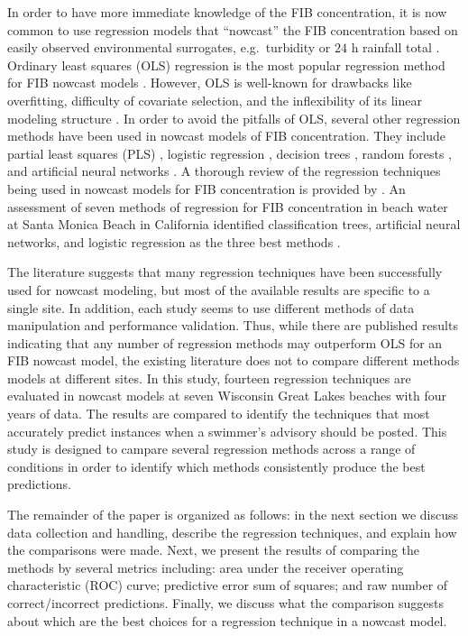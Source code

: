 \documentclass[authoryear,review, 12pt]{elsarticle}
\begin{document}
In order to have more immediate knowledge of the FIB concentration, it
is now common to use regression models that ``nowcast'' the FIB
concentration based on easily observed environmental surrogates,
e.g.~turbidity or $24$ h rainfall total \citep{Brandt:2006gj,Olyphant:2004yq}. Ordinary least squares (OLS) regression is the most popular
regression method for FIB nowcast models
\citep{Nevers:2005ln,Francy:2007yv,deBrauwere-Koffi-Servais-2014}. However, OLS is well-known for
drawbacks like overfitting, difficulty of covariate selection, and the
inflexibility of its linear modeling structure \citep{Ge:2007ou}. 
In order to avoid the pitfalls of OLS, several other regression methods have been used in
 nowcast models of FIB concentration. They include 
partial least squares (PLS) \citep{Hou:2006nf,Brooks-Fienen-Corsi-2013}, logistic regression \citep{Waschbusch:2004bd,Jin:2006tr}, decision trees \citep{Stidson-2012}, random forests
\citep{Parkhurst:2005zf,Jones-Liu-Dorovitch-2012}, and artificial
neural networks \citep{Kashefipour-Lin-Falconer-2005,He:2008jx}. A
thorough review of the regression techniques being used in nowcast
models for FIB concentration is provided by
\cite{deBrauwere-Koffi-Servais-2014}. An assessment of seven methods of
regression for FIB concentration in beach water at Santa Monica Beach in
California identified classification trees, artificial neural networks,
and logistic regression as the three best methods
\citep{Thoe-Gold-Griesbach-Grimmer-Taggart-Boehm-2014}.

The literature suggests that many regression techniques have been
successfully used for nowcast modeling, but most of the available results are 
specific to a single site. In addition, each study seems to use different methods of data manipulation and performance validation. Thus, while there are published results indicating that any number of regression methods may outperform OLS for an FIB nowcast model, the existing literature does not to compare different methods models at different sites. In this
study, fourteen regression techniques are evaluated in nowcast models at
seven Wisconsin Great Lakes beaches with four years of data. The results
are compared to identify the techniques that most accurately predict
instances when a swimmer's advisory should be posted. This study is designed to 
campare several regression methods across a range of conditions in order to identify which 
methods consistently produce the best predictions.

The remainder of the paper is organized as follows: in the next section
we discuss data collection and handling, describe the regression
techniques, and explain how the comparisons were made. Next, we present
the results of comparing the methods by several metrics including: area
under the receiver operating characteristic (ROC) curve; predictive
error sum of squares; and raw number of correct/incorrect predictions.
Finally, we discuss what the comparison suggests about which are the
best choices for a regression technique in a nowcast model.
\end{document}
